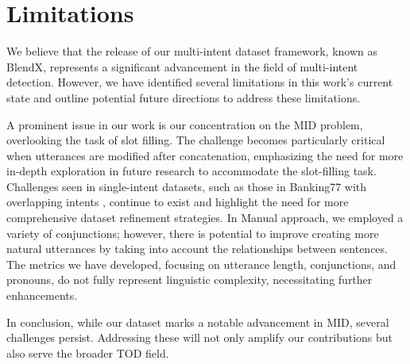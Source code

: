 \section{Limitations}

We believe that the release of our multi-intent dataset framework, known as BlendX, represents a significant advancement in the field of multi-intent detection. However, we have identified several limitations in this work's current state and outline potential future directions to address these limitations.

A prominent issue in our work is our concentration on the MID problem, overlooking the task of slot filling. 
The challenge becomes particularly critical when utterances are modified after concatenation, emphasizing the need for more in-depth exploration in future research to accommodate the slot-filling task. 
Challenges seen in single-intent datasets, such as those in Banking77 with overlapping intents \cite{ying-thomas-2022-label}, continue to exist and highlight the need for more comprehensive dataset refinement strategies.
In Manual approach, we employed a variety of conjunctions; however, there is potential to improve creating more natural utterances by taking into account the relationships between sentences.
The metrics we have developed, focusing on utterance length, conjunctions, and pronouns, do not fully represent linguistic complexity, necessitating further enhancements. 

In conclusion, while our dataset marks a notable advancement in MID, several challenges persist. 
Addressing these will not only amplify our contributions but also serve the broader TOD field.